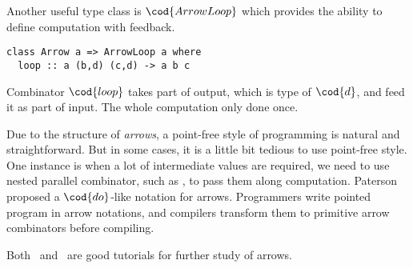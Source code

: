 Another useful type class is $\cod{ArrowLoop}$ which provides the ability to define 
computation with feedback.
\begin{verbatim}
class Arrow a => ArrowLoop a where
  loop :: a (b,d) (c,d) -> a b c
\end{verbatim}
Combinator $\cod{loop}$ takes part of output, which is type of $\cod{d}$, and feed it 
as part of input. The whole computation only done once.

Due to the structure of {\em arrows}, a point-free style of programming is natural and 
straightforward. But in some cases, it is a little bit tedious to use point-free style.
One instance is when a lot of intermediate values are required, we need to use nested
parallel combinator, such as \arrowop{\&}, to pass them along
computation. Paterson~\cite{Paterson:ICFP01} proposed a $\cod{do}$-like notation for arrows.
Programmers write pointed program in arrow notations, and compilers transform them to 
primitive arrow combinators before compiling.

Both~\cite{Hughes:ISSAFP05} and~\cite{Paterson:TFP03} are good tutorials for further 
study of arrows.

